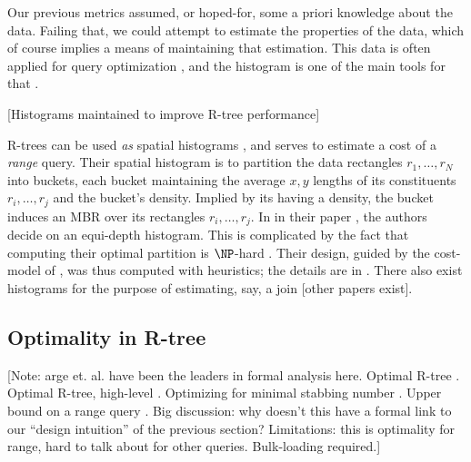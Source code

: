 Our previous metrics assumed, or hoped-for, some a priori knowledge about the data.
Failing that, we could attempt to estimate the properties of the data, which of course implies a means of maintaining that estimation.
This data is often applied for query optimization \cite{chaudhuri98}, and the histogram is one of the main tools for that \cite{poosalahaasioannidisshekita96}.

[Histograms maintained to improve R-tree performance]

R-trees can be used \emph{as} spatial histograms \cite{achakeevseeger12}, and serves to estimate a cost of a \emph{range} query.
Their spatial histogram is to partition the data rectangles $r_1,\ldots,r_N$ into buckets, each bucket maintaining the average $x,y$ lengths of its constituents $r_i,\ldots,r_j$ and the bucket's density.
Implied by its having a density, the bucket induces an MBR over its rectangles $r_i,\ldots,r_j$.
In in their paper \cite{achakeevseeger12}, the authors decide on an equi-depth histogram.
This is complicated by the fact that computing their optimal partition is $\NP$-hard \cite{muthukrishnanpoosalasuel99}.
Their design, guided by the cost-model of \cite{theodoridissellis96}, was thus computed with heuristics; the details are in \cite{achakeevseeger12a}.
There also exist histograms for the purpose of estimating, say, a join \cite{aboulnaganaughton00} [other papers exist].

\subsection{Optimality in R-tree}
[Note: arge et. al. have been the leaders in formal analysis here.
Optimal R-tree \cite{argeberghaverkortyi04}.
Optimal R-tree, high-level \cite{yi12}.
Optimizing for minimal stabbing number \cite{bergkhosraviverdonschotweele11}.
Upper bound on a range query \cite{kanthsingh99}.
Big discussion: why doesn't this have a formal link to our ``design intuition'' of the previous section?
Limitations: this is optimality for range, hard to talk about for other queries.
Bulk-loading required.]
